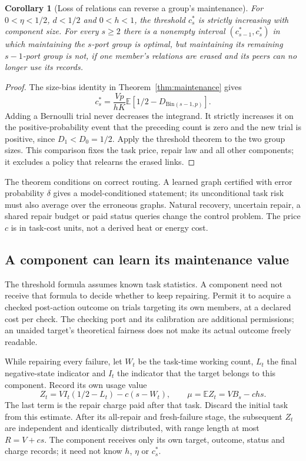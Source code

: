 \documentclass[11pt]{article}
\newtheorem{corollary}[theorem]{Corollary}
\theoremstyle{definition}
\theoremstyle{remark}
\newcommand{\E}{\mathbb E}
\begin{document}
\begin{corollary}[Loss of relations can reverse a group's maintenance]
\label{cor:relation_withdrawal}
For $0<\eta<1/2$, $d<1/2$ and $0<h<1$, the threshold $c_s^*$ is
strictly increasing with component size. For every $s\ge2$ there is
a nonempty interval $(c_{s-1}^*,c_s^*)$ in which maintaining the
$s$-port group is optimal, but maintaining its remaining $s-1$-port
group is not, if one member's relations are erased and its peers
can no longer use its records.
\end{corollary}
\begin{proof}
The size-bias identity in Theorem~\ref{thm:maintenance} gives
\[
 c_s^*=\frac{Vp}{hK}
   \E[1/2-D_{\mathrm{Bin}(s-1,p)}].
\]
Adding a Bernoulli trial never decreases the integrand.
It strictly increases it on the positive-probability event that the
preceding count is zero and the new trial is positive, since
$D_1<D_0=1/2$. Apply the threshold theorem to the two group sizes.
This comparison fixes the task price, repair law and all other
components; it excludes a policy that relearns the erased links.
\end{proof}

The theorem conditions on correct routing. A learned graph certified
with error probability $\delta$ gives a model-conditioned statement;
its unconditional task risk must also average over the erroneous
graphs. Natural recovery, uncertain repair, a shared repair budget or
paid status queries change the control problem. The price $c$ is in
task-cost units, not a derived heat or energy cost.

\subsection{A component can learn its maintenance value}
\label{subsec:local_maintenance}

The threshold formula assumes known task statistics. A component need
not receive that formula to decide whether to keep repairing. Permit
it to acquire a checked post-action outcome on trials targeting its
own members, at a declared cost per check. The checking port and its
calibration are additional permissions; an unaided target's theoretical
fairness does not make its actual outcome freely readable.

While repairing every failure, let $W_t$ be the task-time working count,
$L_t$ the final negative-state indicator and $I_t$ the indicator that
the target belongs to this component. Record its own usage value
\begin{equation}\label{eq:local_usage_value}
 Z_t=V I_t(1/2-L_t)-c(s-W_t),\qquad
 \mu=\E Z_t=V B_s-chs.
\end{equation}
The last term is the repair charge paid after that task. Discard the
initial task from this estimate. After its all-repair and fresh-failure
stage, the subsequent $Z_t$ are independent and identically distributed,
with range length at most $R=V+cs$.
The component receives only its own target, outcome, status and charge
records; it need not know $h$, $\eta$ or $c_s^*$.
\end{document}
